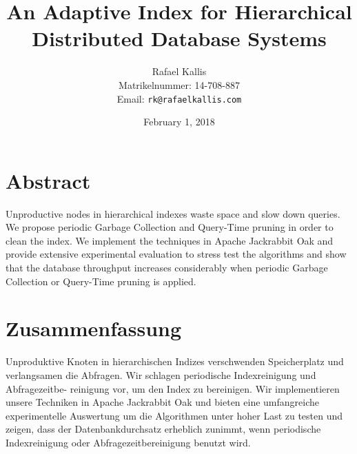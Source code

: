 \documentclass[abstracton,12pt]{scrartcl}
\title{An Adaptive Index for Hierarchical Distributed Database Systems}
\author{
    Rafael Kallis\\[-5pt]
    \scriptsize Matrikelnummer: 14-708-887\\[-5pt]
    \scriptsize Email: \texttt{rk@rafaelkallis.com}
}
\date{\vspace*{2cm}February 1, 2018}
\theoremstyle{definition}
\begin{document}
\maketitle
\thispagestyle{empty}


\newpage
\thispagestyle{empty}
\vspace*{7cm}

\section*{Abstract}

Unproductive nodes in hierarchical indexes waste space and slow down queries.
We propose periodic Garbage Collection and Query-Time pruning in order to
clean the index. We implement the techniques in Apache Jackrabbit Oak and
provide extensive experimental evaluation to stress test the algorithms and
show that the database throughput increases considerably when periodic Garbage
Collection or Query-Time pruning is applied.

\newpage
\thispagestyle{empty}
\vspace*{7cm}

\section*{Zusammenfassung}

Unproduktive Knoten in hierarchischen Indizes verschwenden Speicherplatz und
verlangsamen die Abfragen. Wir schlagen periodische Indexreinigung
und Abfragezeitbe- reinigung vor, um den Index zu bereinigen. Wir implementieren
unsere Techniken in Apache Jackrabbit Oak und bieten eine umfangreiche
experimentelle Auswertung um die Algorithmen unter hoher Last zu testen und
zeigen, dass der Datenbankdurchsatz erheblich zunimmt, wenn periodische
Indexreinigung oder Abfragezeitbereinigung benutzt wird.

\newpage
\thispagestyle{empty}

\tableofcontents

\newpage
\thispagestyle{empty}

\listoffigures

\newpage

\end{document}
